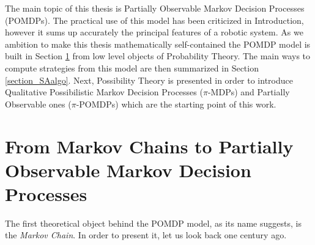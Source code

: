 The main topic of this thesis is Partially Observable Markov Decision Processes (POMDPs).
The practical use of this model has been criticized in Introduction, 
however it sums up accurately the principal features of a robotic system.
As we ambition to make this thesis mathematically self-contained
the POMDP model is built in Section \ref{section_Markov2POMDP} 
from low level objects of Probability Theory.
The main ways to compute strategies from this model are then summarized
in Section \ref{section_SAalgo}.
Next, Possibility Theory is presented
in order to introduce Qualitative Possibilistic Markov Decision Processes ($\pi$-MDPs)
and Partially Observable ones ($\pi$-POMDPs) which are the starting point
of this work.

\section{From Markov Chains to Partially Observable Markov Decision Processes}
\label{section_Markov2POMDP}
The first theoretical object behind the POMDP model, 
as its name suggests, 
is the \textit{Markov Chain}. 
In order to present it, let us look back one century ago.
